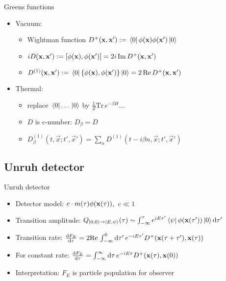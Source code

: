 \documentclass{beamer}
\renewcommand{\va}[1]{\vec{#1}}
\begin{document}
\begin{frame}{Greens functions}
\begin{itemize}
	\item Vacuum:
	\begin{itemize}
		\item Wightman function \(D^+(\vb{x},\vb{x}') := \bra*{0}\phi(\vb{x})\phi(\vb{x}')\ket*{0}\)
 		\item \(i D(\vb{x},\vb{x}') := [\phi(\vb{x}),\phi(\vb{x}')] = 2i\,\mathrm{Im}\,D^+(\vb{x},\vb{x}')\)
		\item \(D^{(1)}(\vb{x},\vb{x}') := \bra*{0}\{\phi(\vb{x}),\phi(\vb{x}')\}\ket*{0}= 2\,\mathrm{Re}\,D^+(\vb{x},\vb{x}')\)
	\end{itemize}
	\item Thermal:
	\begin{itemize}
		\item replace \(\bra*{0}\dots\ket*{0}\) by \(\frac{1}{Z} \mathrm{Tr}\,e^{-\beta H} \dots\)
		\item \(D\) is c-number: \(D_\beta = D\)
		\item \(D^{(1)}_\beta(t,\va{x};t',\va{x}') = \sum_n D^{(1)}(t-i\beta n, \va{x};t',\va{x}')\)
	\end{itemize}
\end{itemize}
\end{frame}
\subsection{Unruh detector}
\begin{frame}{Unruh detector}
\begin{itemize}
	\item Detector model: \(c\cdot m(\tau) \phi(\vb{x}(\tau))\),\, \(c \ll 1\)
	\item Transition amplitude: \(Q_{\ket*{0,0}\to\ket*{E,\psi}}(\tau) \sim \int_{-\infty}^\tau e^{i E \tau'} \bra*{\psi}\phi(\vb{x}(\tau'))\ket*{0}\dd{\tau'}\)
	\item Transition rate: \(\dv{F_E}{\tau} = 2 \mathrm{Re}\,\int_{-\infty}^0 \dd{\tau'} e^{-i E \tau'} D^+(\vb{x}(\tau + \tau'), \vb{x}(\tau))\)
	\item For constant rate: \(\dv{F_E}{\tau} = \int_{-\infty}^\infty \dd{\tau} e^{-i E \tau} D^+(\vb{x}(\tau), \vb{x}(0))\)
	\item Interpretation: \(F_E\) is particle population for observer 
\end{itemize}
\end{frame}
\end{document}
